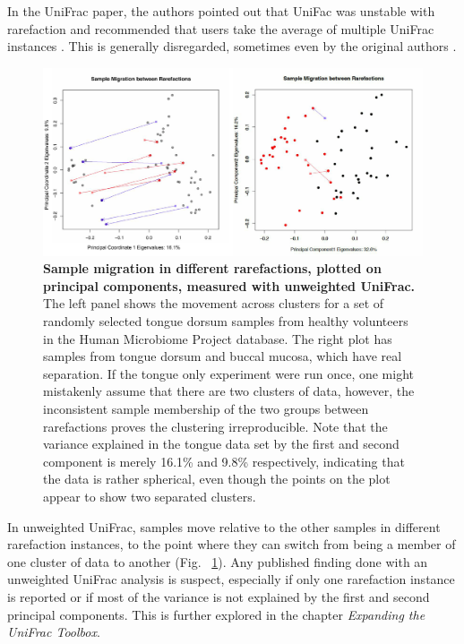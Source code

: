 In the UniFrac paper, the authors pointed out that UniFac was unstable with rarefaction and recommended that users take the average of multiple UniFrac instances \cite{lozupone2011unifrac}. This is generally disregarded, sometimes even by the original authors \cite{mckenna2008macaque} \cite{mcnulty2011impact}.

\begin{figure}[h]
\includegraphics[scale=0.4]{sample_migration.eps}
\caption[Sample migration in different rarefactions, plotted on principal components, measured with unweighted UniFrac.]{{\bf Sample migration in different rarefactions, plotted on principal components, measured with unweighted UniFrac.}
The left panel shows the movement across clusters for a set of randomly selected tongue dorsum samples from healthy volunteers in the Human Microbiome Project database. The right plot has samples from tongue dorsum and buccal mucosa, which have real separation. If the tongue only experiment were run once, one might mistakenly assume that there are two clusters of data, however, the inconsistent sample membership of the two groups between rarefactions proves the clustering irreproducible. Note that the variance explained in the tongue data set by the first and second component is merely 16.1\% and 9.8\% respectively, indicating that the data is rather spherical, even though the points on the plot appear to show two separated clusters.}
\label{figure_sample_migration}
\end{figure}

In unweighted UniFrac, samples move relative to the other samples in different rarefaction instances, to the point where they can switch from being a member of one cluster of data to another (Fig. ~\ref{figure_sample_migration}). Any published finding done with an unweighted UniFrac analysis is suspect, especially if only one rarefaction instance is reported or if most of the variance is not explained by the first and second principal components. This is further explored in the chapter \textit{Expanding the UniFrac Toolbox}.

